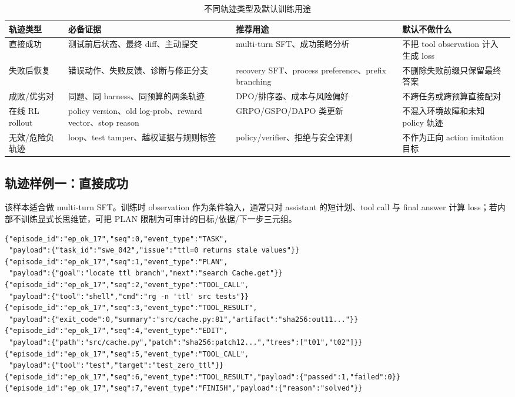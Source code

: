 \documentclass[10pt,a4paper,UTF8,fontset=none]{ctexart}
\newcommand{\ident}[1]{{\rmfamily #1}}
\begin{document}
\begin{table}[htbp]
\centering
\caption{不同轨迹类型及默认训练用途}
\label{tab:trajectory-usage}
\small
\begin{tabularx}{\textwidth}{p{2.5cm}p{4.5cm}YY}
\toprule
轨迹类型 & 必备证据 & 推荐用途 & 默认不做什么 \\
\midrule
直接成功 & 测试前后状态、最终 diff、主动提交 & multi-turn SFT、成功策略分析 & 不把 tool observation 计入生成 loss \\
失败后恢复 & 错误动作、失败反馈、诊断与修正分支 & recovery SFT、process preference、prefix branching & 不删除失败前缀只保留最终答案 \\
成败/优劣对 & 同题、同 harness、同预算的两条轨迹 & DPO/排序器、成本与风险偏好 & 不跨任务或跨预算直接配对 \\
在线 RL rollout & policy version、old log-prob、reward vector、stop reason & GRPO/GSPO/DAPO 类更新 & 不混入环境故障和未知 policy 轨迹 \\
无效/危险负轨迹 & loop、test tamper、越权证据与规则标签 & policy/verifier、拒绝与安全评测 & 不作为正向 action imitation 目标 \\
\bottomrule
\end{tabularx}
\end{table}

\subsection{轨迹样例一：直接成功}

该样本适合做 multi-turn SFT。训练时 observation 作为条件输入，通常只对 assistant 的短计划、tool call 与 final answer 计算 loss；若内部不训练显式长思维链，可把 \ident{PLAN} 限制为可审计的目标/依据/下一步三元组。

\begin{lstlisting}[style=codeblock,basicstyle=\fontsize{7.6}{8.6}\selectfont\ttfamily,framesep=5pt,caption={搜索--编辑--测试--提交的成功轨迹（JSONL）},label={lst:trajectory-success}]
{"episode_id":"ep_ok_17","seq":0,"event_type":"TASK",
 "payload":{"task_id":"swe_042","issue":"ttl=0 returns stale values"}}
{"episode_id":"ep_ok_17","seq":1,"event_type":"PLAN",
 "payload":{"goal":"locate ttl branch","next":"search Cache.get"}}
{"episode_id":"ep_ok_17","seq":2,"event_type":"TOOL_CALL",
 "payload":{"tool":"shell","cmd":"rg -n 'ttl' src tests"}}
{"episode_id":"ep_ok_17","seq":3,"event_type":"TOOL_RESULT",
 "payload":{"exit_code":0,"summary":"src/cache.py:81","artifact":"sha256:out11..."}}
{"episode_id":"ep_ok_17","seq":4,"event_type":"EDIT",
 "payload":{"path":"src/cache.py","patch":"sha256:patch12...","trees":["t01","t02"]}}
{"episode_id":"ep_ok_17","seq":5,"event_type":"TOOL_CALL",
 "payload":{"tool":"test","target":"test_zero_ttl"}}
{"episode_id":"ep_ok_17","seq":6,"event_type":"TOOL_RESULT","payload":{"passed":1,"failed":0}}
{"episode_id":"ep_ok_17","seq":7,"event_type":"FINISH","payload":{"reason":"solved"}}
\end{lstlisting}
\end{document}
